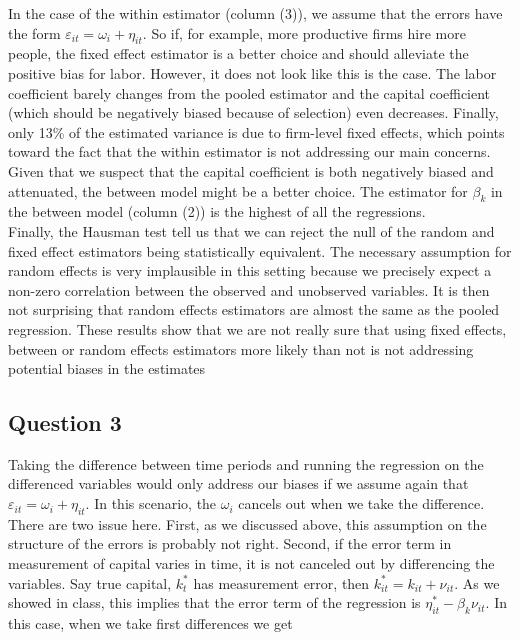 \documentclass[11pt]{article}
\begin{document}
In the case of the within estimator (column (3)), we assume that the errors have the form $\varepsilon_{it}=\omega_i+\eta_{it}$. So if, for example, more productive firms hire more people, the fixed effect estimator is a better choice and should alleviate the positive bias for labor. However, it does not look like this is the case. The labor coefficient barely changes from the pooled estimator and the capital coefficient (which should be negatively biased because of selection) even decreases. Finally, only 13\% of the estimated variance is due to firm-level fixed effects, which points toward the fact that the within estimator is not addressing our main concerns. \\

Given that we suspect that the capital coefficient is both negatively biased and attenuated, the between model might be a better choice. The estimator for $\beta_k$ in the between model (column (2)) is the highest of all the regressions. \\

Finally, the Hausman test tell us that we can reject the null of the random and fixed effect estimators being statistically equivalent. The necessary assumption for random effects is very implausible in this setting because we precisely expect a non-zero correlation between the observed and unobserved variables. It is then not surprising that random effects estimators are almost the same as the pooled regression.  These results show that we are not really sure that using fixed effects, between or random effects estimators more likely than not is not addressing potential biases in the estimates



\FloatBarrier

\subsection*{Question 3} \label{q3}



\FloatBarrier

Taking the difference between time periods and running the regression on the differenced variables would only address our biases if we assume again that $\varepsilon_{it}=\omega_i+\eta_{it}$. In this scenario, the $\omega_i$ cancels out when we take the difference. There are two issue here. First, as we discussed above, this assumption on the structure of the errors is probably not right. Second, if the error term in measurement of capital varies in time, it is not canceled out by differencing the variables. Say true capital, $k^*_t$ has measurement error, then $k^*_{it}=k_{it}+\nu_{it}$. As we showed in class, this implies that the error term of the regression is $\eta_{it}^*-\beta_k\nu_{it}$. In this case, when we take first differences we get
\end{document}
